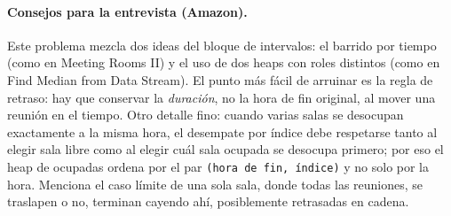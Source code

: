 \paragraph{Consejos para la entrevista (Amazon).} Este problema mezcla dos
ideas del bloque de intervalos: el barrido por tiempo (como en Meeting
Rooms II) y el uso de dos heaps con roles distintos (como en Find Median
from Data Stream). El punto más fácil de arruinar es la regla de retraso:
hay que conservar la \emph{duración}, no la hora de fin original, al mover
una reunión en el tiempo. Otro detalle fino: cuando varias salas se
desocupan exactamente a la misma hora, el desempate por índice debe
respetarse tanto al elegir sala libre como al elegir cuál sala ocupada se
desocupa primero; por eso el heap de ocupadas ordena por el par
\texttt{(hora de fin, índice)} y no solo por la hora. Menciona el caso
límite de una sola sala, donde todas las reuniones, se traslapen o no,
terminan cayendo ahí, posiblemente retrasadas en cadena.
